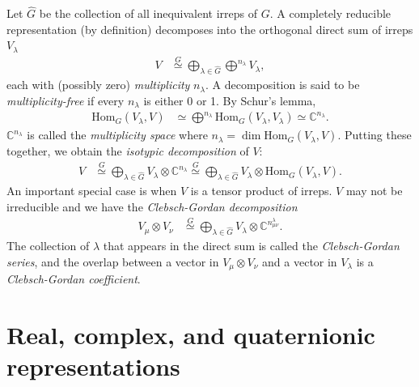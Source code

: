 Let $\hat{G}$ be the collection of all inequivalent irreps of $G$. A completely reducible representation (by definition) decomposes into the orthogonal direct sum of irreps $V_{\lambda}$
\begin{align}
V &\stackrel{G}{\simeq} \bigoplus_{\lambda \in \hat{G}} \bigoplus^{n_{\lambda}} V_{\lambda},
\end{align}
each with (possibly zero) \emph{multiplicity} $n_{\lambda}$. A decomposition is said to be \emph{multiplicity-free} if every $n_{\lambda}$ is either 0 or 1. By Schur's lemma,
\begin{align}
\text{Hom}_G (V_{\lambda},V) &\simeq \bigoplus^{n_{\lambda}} \text{Hom}_G ( V_{\lambda}, V_{\lambda} ) \simeq \mathbb{C}^{n_{\lambda}}.
\end{align}
$\mathbb{C}^{n_{\lambda}}$ is called the \emph{multiplicity space} where $n_{\lambda} = \dim \text{Hom}_G (V_{\lambda},V)$. Putting these together, we obtain the \emph{isotypic decomposition} of $V$:
\begin{align}
V &\stackrel{G}{\simeq} \bigoplus_{\lambda \in \hat{G}} V_{\lambda} \otimes \mathbb{C}^{n_{\lambda}}
\stackrel{G}{\simeq} \bigoplus_{\lambda \in \hat{G}} V_{\lambda} \otimes \text{Hom}_G (V_{\lambda},V).
\end{align}
An important special case is when $V$ is a tensor product of irreps. $V$ may not be irreducible and we have the \emph{Clebsch-Gordan decomposition}
\begin{align}
	V_{\mu} \otimes V_{\nu} &\stackrel{G}{\simeq} \bigoplus_{\lambda \in \hat{G}} V_{\lambda} \otimes \mathbb{C}^{n^{\lambda}_{\mu\nu}}.
\end{align}
The collection of $\lambda$ that appears in the direct sum is called the \emph{Clebsch-Gordan series}, and the overlap between a vector in $V_{\mu} \otimes V_{\nu}$ and a vector in $V_{\lambda}$ is a \emph{Clebsch-Gordan coefficient}.

\section{Real, complex, and quaternionic representations}\label{ch2:real-representation}

